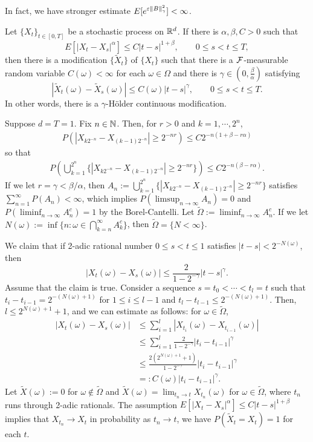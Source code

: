 \documentclass{../../../small}
\begin{document}
In fact, we have stronger estimate $E[e^{\varepsilon\|B\|_\gamma^2}]<\infty$.

\begin{thm}
Let $\{X_t\}_{t\in[0,T]}$ be a stochastic process on $\mathbb{R}^d$.
If there is $\alpha,\beta,C>0$ such that
\[E[|X_t-X_s|^\alpha]\le C|t-s|^{1+\beta},\qquad 0\le s<t\le T,\]
then there is a modification $\{\tilde X_t\}$ of $\{X_t\}$ such that there is a $\mathcal{F}$-measurable random variable $C(\omega)<\infty$ for each $\omega\in\Omega$ and there is $\gamma\in(0,\frac\beta\alpha)$ satisfying
\[|\tilde X_t(\omega)-\tilde X_s(\omega)|\le C(\omega)|t-s|^\gamma,\qquad 0\le s<t\le T.\]
In other words, there is a $\gamma$-H\"older continuous modification.
\end{thm}
\begin{pf}
Suppose $d=T=1$.
Fix $n\in\mathbb{N}$.
Then, for $r>0$ and $k=1,\cdots,2^n$,
\begin{align*}
P(|X_{k2^{-n}}-X_{(k-1)2^{-n}}|\ge2^{-nr})\le C2^{-n(1+\beta-r\alpha)}
\end{align*}
so that
\begin{align*}
P(\bigcup_{k=1}^{2^n}\{|X_{k2^{-n}}-X_{(k-1)2^{-n}}|\ge2^{-nr}\})\le C2^{-n(\beta-r\alpha)}.
\end{align*}
If we let $r=\gamma<\beta/\alpha$, then $A_n:=\bigcup_{k=1}^{2^n}\{|X_{k2^{-n}}-X_{(k-1)2^{-n}}|\ge2^{-nr}\}$ satisfies $\sum_{n=1}^\infty P(A_n)<\infty$, which implies $P(\limsup_{n\to\infty}A_n)=0$ and $P(\liminf_{n\to\infty}A_n^c)=1$ by the Borel-Cantelli.
Let $\tilde\Omega:=\liminf_{n\to\infty}A_n^c$.
If we let $N(\omega):=\inf\{n:\omega\in\bigcap_{k=n}^\infty A_k^c\}$, then $\tilde\Omega=\{N<\infty\}$.

We claim that if 2-adic rational number $0\le s<t\le1$ satisfies $|t-s|<2^{-N(\omega)}$, then
\[|X_t(\omega)-X_s(\omega)|\le\frac2{1-2^{-\gamma}}|t-s|^\gamma.\]
Assume that the claim is true.
Consider a sequence $s=t_0<\cdots<t_l=t$ such that $t_i-t_{i-1}=2^{-(N(\omega)+1)}$ for $1\le i\le l-1$ and $t_l-t_{l-1}\le2^{-(N(\omega)+1)}$.
Then, $l\le 2^{N(\omega)+1}+1$, and we can estimate as follows: for $\omega\in\tilde\Omega$,
\begin{align*}
|X_t(\omega)-X_s(\omega)|
&\le\sum_{i=1}^l|X_{t_i}(\omega)-X_{t_{i-1}}(\omega)|\\
&\le\sum_{i=1}^l\frac2{1-2^{-\gamma}}|t_i-t_{i-1}|^\gamma\\
&\le\frac{2(2^{N(\omega)+1}+1)}{1-2^{-\gamma}}|t_i-t_{i-1}|^\gamma\\
&=:C(\omega)|t_i-t_{i-1}|^\gamma.
\end{align*}
Let $\tilde X(\omega):=0$ for $\omega\notin\tilde\Omega$ and $\tilde X(\omega)=\lim_{t_n\to t}X_{t_n}(\omega)$ for $\omega\in\tilde\Omega$, where $t_n$ runs through 2-adic rationals.
The assumption $E[|X_t-X_s|^\alpha]\le C|t-s|^{1+\beta}$ implies that $X_{t_n}\to X_t$ in probability as $t_n\to t$, we have $P(\tilde X_t=X_t)=1$ for each $t$.
\end{pf}
\end{document}
